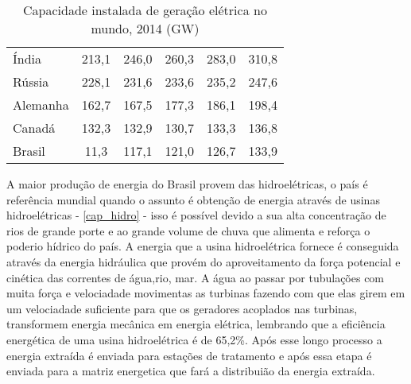 \begin{table}[!ht]
\begin{tabular}{lccccc}
		Índia                                        & 213,1                                & 246,0                                & 260,3                                & 283,0                                & 310,8                                                                            \\
		\rowcolor[HTML]{DDDDDD} 
		Rússia                                       & 228,1                                & 231,6                                & 233,6                                & 235,2                                & 247,6                                                                            \\
		Alemanha                                     & 162,7                                & 167,5                                & 177,3                                & 186,1                                & 198,4                                                                            \\
		\rowcolor[HTML]{DDDDDD} 
		Canadá                                       & 132,3                                & 132,9                                & 130,7                                & 133,3                                & 136,8                                                                            \\
		Brasil                                       & 11,3                                 & 117,1                                & 121,0                                & 126,7                                & 133,9                                                                           
	\end{tabular}
	\caption{Capacidade instalada de geração elétrica no mundo, 2014 (GW)}
	\label{cap_ele}
\end{table}

A maior produção de energia do Brasil provem das hidroelétricas, o país é referência mundial quando o assunto é obtenção de energia através de
usinas hidroelétricas - \autoref{cap_hidro} - isso é possível devido a sua alta concentração de rios de grande porte e ao grande volume de chuva
que alimenta e reforça o poderio hídrico do país. A energia que a usina hidroelétrica fornece é conseguida através da energia hidráulica que provém
do aproveitamento da força potencial e cinética das correntes de água,rio, mar. A água ao passar por tubulações com muita força e velociadade 
movimentas as turbinas fazendo com que elas girem em um velociadade suficiente para que os geradores acoplados nas turbinas, transformem energia
mecânica em energia elétrica, lembrando que a eficiência energética de uma usina hidroelétrica é de 65,2\%. Após esse longo processo a energia 
extraída é enviada para estações de tratamento e após essa etapa é enviada para a matriz energetica que fará a distribuião da energia extraída. 


